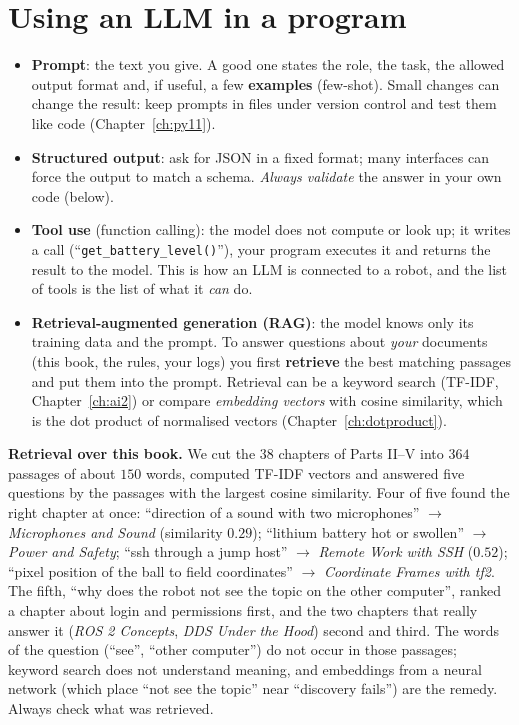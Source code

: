 \section*{Using an LLM in a program}
\begin{itemize}[nosep]
\item \textbf{Prompt}: the text you give. A good one states the role, the task, the allowed output format and, if useful, a few \textbf{examples} (few-shot). Small changes can change the result: keep prompts in files under version control and test them like code (Chapter~\ref{ch:py11}).
\item \textbf{Structured output}: ask for JSON in a fixed format; many interfaces can force the output to match a schema. \emph{Always validate} the answer in your own code (below).
\item \textbf{Tool use} (function calling): the model does not compute or look up; it writes a call (``\texttt{get\_battery\_level()}''), your program executes it and returns the result to the model. This is how an LLM is connected to a robot, and the list of tools is the list of what it \emph{can} do.
\item \textbf{Retrieval-augmented generation (RAG)}: the model knows only its training data and the prompt. To answer questions about \emph{your} documents (this book, the rules, your logs) you first \textbf{retrieve} the best matching passages and put them into the prompt. Retrieval can be a keyword search (TF-IDF, Chapter~\ref{ch:ai2}) or compare \emph{embedding vectors} with cosine similarity, which is the dot product of normalised vectors (Chapter~\ref{ch:dotproduct}).
\end{itemize}
\begin{example}
\textbf{Retrieval over this book.} We cut the $38$ chapters of Parts II--V into $364$ passages of about $150$ words, computed TF-IDF vectors and answered five questions by the passages with the largest cosine similarity. Four of five found the right chapter at once: ``direction of a sound with two microphones'' $\to$ \emph{Microphones and Sound} (similarity $0.29$); ``lithium battery hot or swollen'' $\to$ \emph{Power and Safety}; ``ssh through a jump host'' $\to$ \emph{Remote Work with SSH} ($0.52$); ``pixel position of the ball to field coordinates'' $\to$ \emph{Coordinate Frames with tf2}. The fifth, ``why does the robot not see the topic on the other computer'', ranked a chapter about login and permissions first, and the two chapters that really answer it (\emph{ROS 2 Concepts}, \emph{DDS Under the Hood}) second and third. The words of the question (``see'', ``other computer'') do not occur in those passages; keyword search does not understand meaning, and embeddings from a neural network (which place ``not see the topic'' near ``discovery fails'') are the remedy. Always check what was retrieved.
\end{example}
